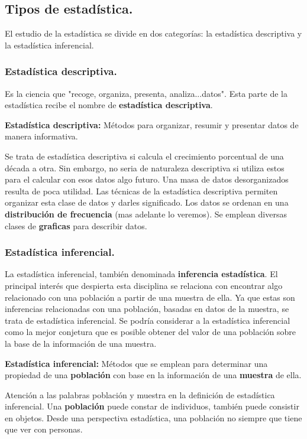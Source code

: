 \documentclass[]{article}
\begin{document}
\subsection{Tipos de estadística.}
El estudio de la estadística se divide en dos categorías: la estadística descriptiva y la estadística inferencial.
\subsubsection*{Estadística descriptiva.}
Es la ciencia que "recoge, organiza, presenta, analiza...datos". Esta parte de la estadística recibe el nombre de \textbf{estadística descriptiva}.

\begin{flushleft}
\textbf{Estadística descriptiva:} Métodos para organizar, resumir y presentar datos de manera informativa.
\end{flushleft}
Se trata de estadística descriptiva si calcula el crecimiento porcentual de una década a otra. Sin embargo, no seria de naturaleza descriptiva si utiliza estos para el calcular con esos datos algo futuro.
Una masa de datos desorganizados resulta de poca utilidad. Las técnicas de la estadística descriptiva permiten organizar esta clase de datos y darles significado. Los datos se ordenan en una \textbf{distribución de frecuencia} (mas adelante lo veremos). Se emplean diversas clases de \textbf{graficas} para describir datos.

\subsubsection*{Estadística inferencial.}
La estadística inferencial, también denominada \textbf{inferencia estadística}. El principal interés que despierta esta disciplina se relaciona con encontrar algo relacionado con una población a partir de una muestra de ella. Ya que estas son inferencias relacionadas con una población, basadas en datos de la muestra, se trata de estadística inferencial. Se podría considerar a la estadística inferencial como la mejor conjetura que es posible obtener del valor de una población sobre la base de la información de una muestra.
\begin{flushleft}
	\textbf{Estadística inferencial: }Métodos que se emplean para determinar una propiedad de una \textbf{población} con base en la información de una \textbf{muestra} de ella.
\end{flushleft}
Atención a las palabras población y muestra en la definición de estadística inferencial. Una \textbf{población} puede constar de individuos, también puede consistir en objetos. Desde una perspectiva estadística, una población no siempre que tiene que ver con personas.
\end{document}
